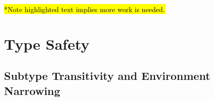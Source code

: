 \documentclass{llncs}
\numberwithin{subcase}{case}
\numberwithin{case}{theorem}
\numberwithin{case}{lemma}
\begin{document}
\hl{*Note highlighted text implies more work is needed.}
\section{Type Safety}

\subsection{Subtype Transitivity and Environment Narrowing}




\end{document}
